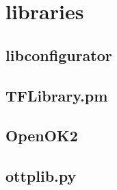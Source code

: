 
\section{libraries}

\subsection{libconfigurator}

\subsection{TFLibrary.pm}

\subsection{OpenOK2}

\subsection{ottplib.py}

